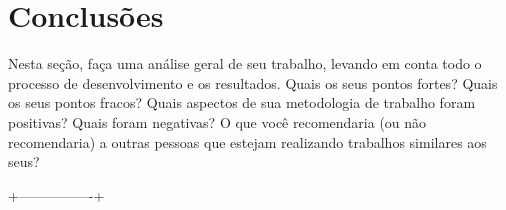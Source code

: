 \documentclass[twoside,conference,a4paper]{IEEEtran}
\begin{document}
\section{Conclusões}

Nesta seção, faça uma análise geral de seu trabalho, levando em conta todo o processo de desenvolvimento e os resultados. Quais os seus pontos fortes? Quais os seus pontos fracos? Quais aspectos de sua metodologia de trabalho foram positivas? Quais foram negativas? O que você recomendaria (ou não recomendaria) a outras pessoas que estejam realizando trabalhos similares aos seus? \cite{Rowling:1997}


 +----------------+






\end{document}
